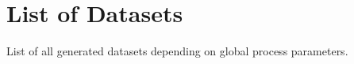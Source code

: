 \chapter{List of Datasets}
\label{app:list_of_datasets}

List of all generated datasets depending on global process parameters.